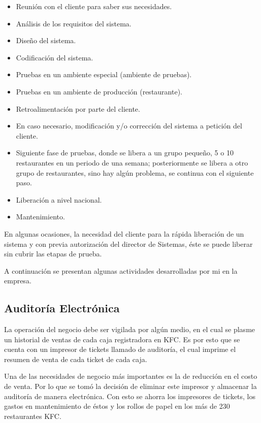 \begin{itemize}
 \item Reunión con el cliente para saber sus necesidades.
 \item Análisis de los requisitos del sistema.
 \item Diseño del sistema.
 \item Codificación del sistema.
 \item Pruebas en un ambiente especial (ambiente de pruebas).
 \item Pruebas en un ambiente de producción (restaurante).
 \item Retroalimentación por parte del cliente.
 \item En caso necesario, modificación y/o corrección del sistema a petición del cliente.
 \item Siguiente fase de pruebas, donde se libera a un grupo pequeño, 5 o 10 restaurantes en un periodo de una semana; posteriormente se libera a otro grupo de restaurantes, sino hay algún problema, se continua con el siguiente paso.
 \item Liberación a nivel nacional.
 \item Mantenimiento.
\end{itemize}

En algunas ocasiones, la necesidad del cliente para la rápida liberación de un sistema y con previa autorización del director de Sistemas, éste se puede liberar sin cubrir las etapas de prueba.

A continuación se presentan algunas actividades desarrolladas por mi en la empresa.

\subsection{Auditoría Electrónica}
\label{sec:auditoria}

La operación del negocio debe ser vigilada por algún medio, en el cual se plasme un historial de ventas de cada caja registradora en KFC. Es por esto que se cuenta con un impresor de tickets llamado de auditoría, el cual imprime el resumen de venta de cada ticket de cada caja.

Una de las necesidades de negocio más importantes es la de reducción en el costo de venta. Por lo que se tomó la decisión de eliminar este impresor y almacenar la auditoría de manera electrónica. Con esto se ahorra los impresores de tickets, los gastos en mantenimiento de éstos y los rollos de papel en los más de 230 restaurantes KFC.

